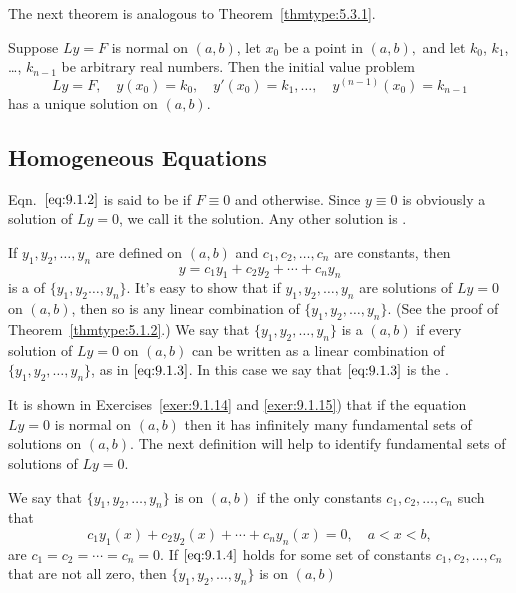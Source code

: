 \documentclass{ximera}
\begin{document}
The next theorem is analogous to
Theorem~\ref{thmtype:5.3.1}.

\begin{theorem}\label{thmtype:9.1.1}
Suppose $Ly=F$ is normal on $(a,b)$, let $x_0$ be a point in
$(a,b),$
and let $k_0$, $k_1$, \dots, $k_{n-1}$ be arbitrary real numbers. Then
the initial value problem
$$
Ly=F, \quad  y(x_0)=k_0,\quad y'(x_0)=k_1,\dots,\quad y^{(n-1)}(x_0)=k_{n-1}
$$
has a unique solution on $(a,b)$.
\end{theorem}

\subsection*{Homogeneous Equations}

Eqn.~$\eqref{eq:9.1.2}$ is said to be  if $F\equiv0$ and  otherwise. Since $y\equiv0$ is obviously a
solution of $Ly=0$, we call it the  solution. Any other
solution is .



If $y_1, y_2, \dots, y_n$ are defined on $(a,b)$ and
$c_1, c_2, \dots, c_n$ are constants, then
\begin{equation}\label{eq:9.1.3}
y=c_1y_1+c_2y_2+\cdots+c_ny_n
\end{equation}
is a  of $\{y_1,y_2\dots,y_n\}$. It's
easy
 to show that if $y_1, y_2, \dots, y_n$ are solutions of
$Ly=0$ on $(a,b)$, then so is any linear combination of
$\{y_1,y_2,\dots,y_n\}$. (See the proof of Theorem~\ref{thmtype:5.1.2}.) We
say that $\{y_1,y_2,\dots,y_n\}$ is a  $(a,b)$ if every solution of $Ly=0$ on
$(a,b)$ can be written as a linear combination of
$\{y_1,y_2,\dots,y_n\}$, as in $\eqref{eq:9.1.3}$. In this case we say that
$\eqref{eq:9.1.3}$ is the .


It is shown in Exercises~\ref{exer:9.1.14} and \ref{exer:9.1.15}) 
that if the equation $Ly=0$ is normal on $(a,b)$ then it has
infinitely many fundamental  sets of solutions  on $(a,b)$.
The next definition will help to identify fundamental sets of
solutions of $Ly=0$.

We say that $\{y_1,y_2,\dots,y_n\}$ is  on
$(a,b)$ if the only constants $c_1, c_2, \dots, c_n$ such that
\begin{equation}\label{eq:9.1.4}
c_1y_1(x)+c_2y_2(x)+\cdots+c_ny_n(x)=0,\quad a<x<b,
\end{equation}
are $c_1=c_2=\cdots=c_n=0$. If $\eqref{eq:9.1.4}$ holds for some set of constants $c_1, c_2, \dots, c_n$ that are not all zero, then
$\{y_1,y_2,\dots,y_n\}$ is  on $(a,b)$
\end{document}
